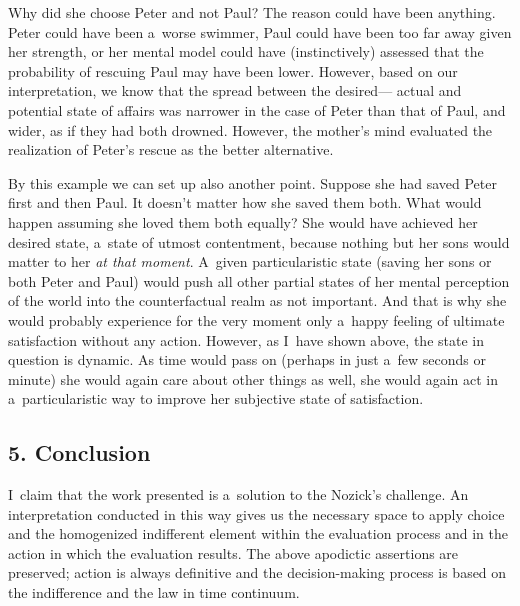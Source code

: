Why did she choose Peter and not Paul? The reason could have been anything. Peter could have been a~worse swimmer, Paul could have been too far away given her strength, or her mental model could have (instinctively) assessed that the probability of rescuing Paul may have been lower. However, based on our interpretation, we know that the spread between the desired--- actual and potential state of affairs was narrower in the case of Peter than that of Paul, and wider, as if they had both drowned. However, the mother's mind evaluated the realization of Peter's rescue as the better alternative.



By this example we can set up also another point. Suppose she had saved Peter first and then Paul. It doesn't matter how she saved them both. What would happen assuming she loved them both equally? She would have achieved her desired state, a~state of utmost contentment, because nothing but her sons would matter to her \textit{at that moment}. A~given particularistic state (saving her sons or both Peter and Paul) would push all other partial states of her mental perception of the world into the counterfactual realm as not important. And that is why she would probably experience for the very moment only a~happy feeling of ultimate satisfaction without any action. However, as I~have shown above, the state in question is dynamic. As time would pass on (perhaps in just a~few seconds or minute) she would again care about other things as well, she would again act in a~particularistic way to improve her subjective state of satisfaction.



\subsection*{5. Conclusion}



I~claim that the work presented is a~solution to the Nozick's challenge. An interpretation conducted in this way gives us the necessary space to apply choice and the homogenized indifferent element within the evaluation process and in the action in which the evaluation results. The above apodictic assertions are preserved; action is always definitive and the decision-making process is based on the indifference and the law in time continuum.



